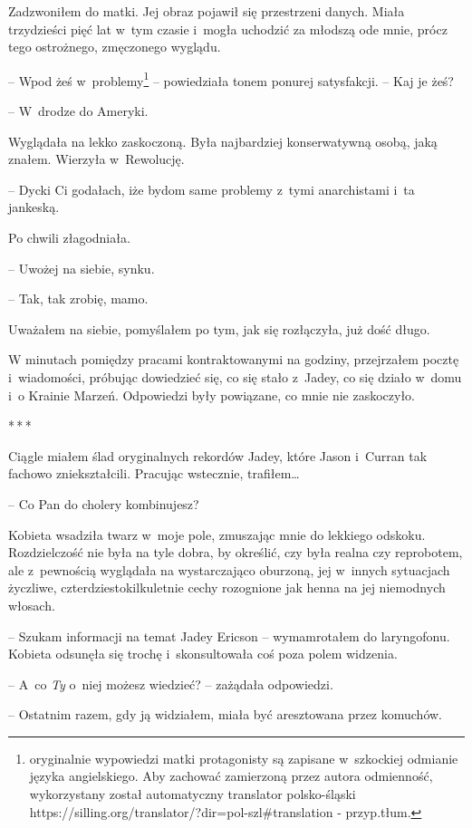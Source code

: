 \documentclass[oneside,polish,12pt,sfheadings]{mwbk}
\newcommand{\threeast}{\bigskip\par\centerline{*\,*\,*}\medskip\par}%
\begin{document}
Zadzwoniłem do matki. Jej obraz pojawił się przestrzeni danych. Miała
trzydzieści pięć lat w~tym czasie i~mogła uchodzić za młodszą ode mnie,
prócz tego ostrożnego, zmęczonego wyglądu.

-- Wpod żeś w~problemy\footnote{oryginalnie wypowiedzi
matki protagonisty są zapisane w~szkockiej odmianie języka angielskiego. Aby zachować
zamierzoną przez autora odmienność, wykorzystany został automatyczny
translator polsko-śląski
https://silling.org/translator/?dir=pol-szl\#translation - przyp.tłum.}
-- powiedziała tonem ponurej satysfakcji. -- Kaj je żeś?

-- W~drodze do Ameryki.

Wyglądała na lekko zaskoczoną. Była najbardziej konserwatywną osobą,
jaką znałem. Wierzyła w~Rewolucję.

-- Dycki Ci godałach, iże bydom same problemy z~tymi anarchistami i~ta
jankeską.

Po chwili złagodniała. 

-- Uwożej na siebie, synku.

-- Tak, tak zrobię, mamo.

Uważałem na siebie, pomyślałem po tym, jak się rozłączyła, już dość
długo.

W minutach pomiędzy pracami kontraktowanymi na godziny, przejrzałem
pocztę i~wiadomości, próbując dowiedzieć się, co się stało z~Jadey, co
się działo w~domu i~o Krainie Marzeń. Odpowiedzi były powiązane, co mnie
nie zaskoczyło.

\threeast

Ciągle miałem ślad oryginalnych rekordów Jadey, które Jason i~Curran tak
fachowo zniekształcili. Pracując wstecznie, trafiłem\ldots

-- Co Pan do cholery kombinujesz?

Kobieta wsadziła twarz w~moje pole, zmuszając mnie do lekkiego odskoku.
Rozdzielczość nie była na tyle dobra, by określić, czy była realna czy
reprobotem, ale z~pewnością wyglądała na wystarczająco oburzoną, jej w~innych sytuacjach życzliwe, czterdziestokilkuletnie cechy rozognione jak
henna na jej niemodnych włosach.

-- Szukam informacji na temat Jadey Ericson -- wymamrotałem do
laryngofonu. Kobieta odsunęła się trochę i~skonsultowała coś poza polem
widzenia.

-- A~co \emph{Ty} o~niej możesz wiedzieć? -- zażądała odpowiedzi.

-- Ostatnim razem, gdy ją widziałem, miała być aresztowana przez
komuchów.
\end{document}
